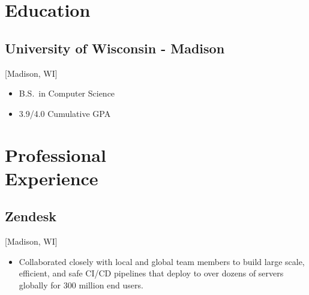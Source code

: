 \documentclass{mycv}
\begin{document}
\maketitle
\section{Education}
\subsection{University of Wisconsin - Madison}[Madison, WI]
\begin{itemize}[label={}]
  \item B.S.\ in Computer Science 
  \item 3.9/4.0 Cumulative GPA
\end{itemize}
\section{Professional \\ Experience}
\subsection{Zendesk}[Madison, WI]
\begin{positions}
\end{positions}
\begin{itemize}
  \item {
     Collaborated closely with local and global team members to build large scale, efficient, and safe CI/CD pipelines that deploy to over dozens of servers globally for 300 million end users.
  }
 \end{itemize}
  
  
\end{document}

